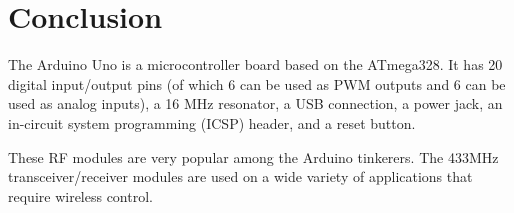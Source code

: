 \documentclass[12pt]{article}
\begin{document}
\section{Conclusion}
The Arduino Uno is a microcontroller board based on the ATmega328. It has 20 digital input/output pins (of which 6 can be used as PWM outputs and 6 can be used as analog inputs), a 16 MHz resonator, a USB connection, a power jack, an in-circuit system programming (ICSP) header, and a reset button.


These RF modules are very popular among the Arduino tinkerers. The 433MHz transceiver/receiver modules are used on a wide variety of applications that require wireless control.

\newpage


\end{document}
